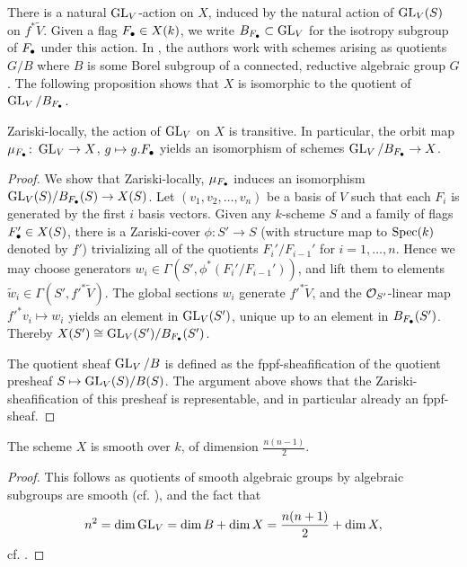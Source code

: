 \documentclass[../main.tex]{subfiles}
\begin{document}
There is a natural $\operatorname{GL}_V$-action on $X$, induced by the natural action of 
$\operatorname{GL}_V(S)$ on $f^* \tilde V$. Given a flag $F_\bullet \in
X(k)$, we write $B_{F_\bullet} \subset \operatorname{GL}_V$ for the isotropy subgroup of $F_\bullet$
under this action. In \cite{delignelusztig1976}, the authors work with schemes
arising as quotients $G/B$ where $B$ is some Borel subgroup of a connected, reductive
algebraic group $G$. 
The following proposition shows that $X$ is isomorphic to the quotient of 
$\operatorname{GL}_V/B_{F_\bullet}$.

\begin{prop}\label{prop:FlagVarietyAsQuotient}
  Zariski-locally, the action of $\operatorname{GL}_V$ on $X$ is transitive. 
  In particular, the orbit map $\mu_{F_\bullet}\colon  \operatorname{GL}_V \to X$, $g \mapsto g.F_\bullet$
  yields an isomorphism of schemes $\operatorname{GL}_V/B_{F_\bullet} \to X$. 
\begin{proof}
  We show that Zariski-locally, $\mu_{F_\bullet}$ induces an isomorphism 
  $\operatorname{GL}_V(S)/B_{F_\bullet}(S) \to X(S)$.
  Let $(v_1, v_2, \dots, v_n)$ be a basis of $V$ such that each $F_i$ is generated
  by the first $i$ basis vectors. 
  Given any $k$-scheme $S$ and a family of flags $F_\bullet' \in X(S)$, 
  there is a Zariski-cover $\phi\colon  S' \to S$ (with structure map to $\operatorname{Spec}(k)$ denoted
  by $f'$) trivializing all of the quotients $F_i'/F_{i-1}'$ for $i = 1, \dots,
  n$. Hence we may choose generators $w_i \in \Gamma(S', \phi^*(F_i'/F_{i-1}'))$,
  and lift them to elements $\tilde w_i \in \Gamma(S', f'^* \tilde V)$. The 
  global sections $w_i$ generate $f'^* \tilde V$, and the $\mathcal{O}_{S'}$-linear
  map $f'^* v_i \mapsto w_i$ yields an element in $\operatorname{GL}_V(S')$, unique up to 
  an element in $B_{F_\bullet}(S')$. Thereby $X(S') \cong \operatorname{GL}_V(S')/B_{F_\bullet}(S')$.

  The quotient sheaf $\operatorname{GL}_V/B$ is 
  defined as the fppf-sheafification of the quotient presheaf $S \mapsto \operatorname{GL}_V(S)/B(S)$.
  The argument above shows that the Zariski-sheafification of this presheaf is
  representable, and in particular already an fppf-sheaf.
\end{proof}
\end{prop}

\begin{cor}\label{cor:XisSmoothAndOfDimension}
  The scheme $X$ is smooth over $k$, of dimension $\frac{n(n-1)}2$. 
\begin{proof}
  This follows as quotients of smooth algebraic groups by algebraic subgroups are 
  smooth (cf. \cite[Corollary 5.26]{milne2017algebraic}), and the fact that 
  $$n^2 = \dim \operatorname{GL}_V = \dim B + \dim X = \frac{n(n+1)}2 + \dim X,$$
  cf. \cite[Proposition 5.23]{milne2017algebraic}. 
\end{proof}
\end{cor}
\end{document}
